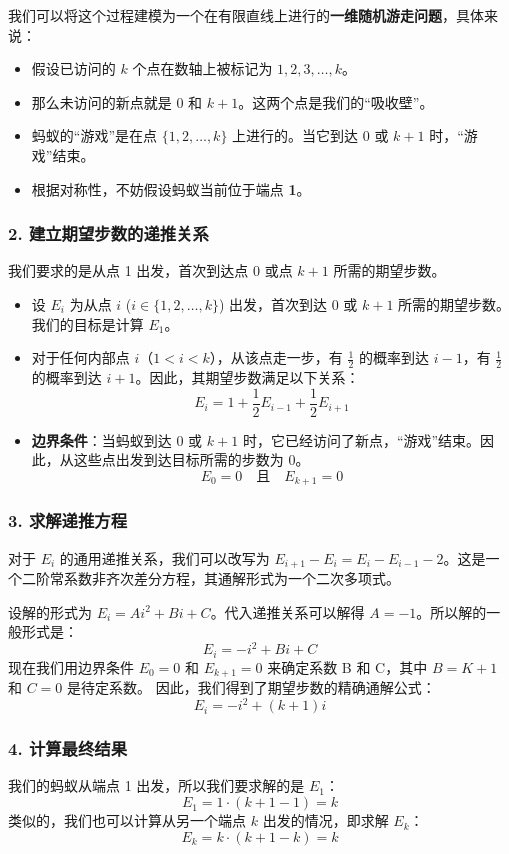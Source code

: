 \documentclass[UTF8]{ctexart}
\begin{document}
我们可以将这个过程建模为一个在有限直线上进行的\textbf{一维随机游走问题}，具体来说：
\begin{itemize}
    \item 假设已访问的 $k$ 个点在数轴上被标记为 $1, 2, 3, \dots, k$。
    \item 那么未访问的新点就是 0 和 $k+1$。这两个点是我们的“吸收壁”。
    \item 蚂蚁的“游戏”是在点 $\{1, 2, \dots, k\}$ 上进行的。当它到达 0 或 $k+1$ 时，“游戏”结束。
    \item 根据对称性，不妨假设蚂蚁当前位于端点 \textbf{1}。
\end{itemize}

\subsubsection*{2. 建立期望步数的递推关系}
我们要求的是从点 1 出发，首次到达点 0 或点 $k+1$ 所需的期望步数。
\begin{itemize}
    \item 设 $E_i$ 为从点 $i$ ($i \in \{1, 2, \dots, k\}$) 出发，首次到达 0 或 $k+1$ 所需的期望步数。我们的目标是计算 $E_1$。
    \item 对于任何内部点 $i$（$1 < i < k$），从该点走一步，有 $\frac{1}{2}$ 的概率到达 $i-1$，有 $\frac{1}{2}$ 的概率到达 $i+1$。因此，其期望步数满足以下关系：
    \[
    E_i = 1 + \frac{1}{2}E_{i-1} + \frac{1}{2}E_{i+1}
    \]
    \item \textbf{边界条件}：当蚂蚁到达 0 或 $k+1$ 时，它已经访问了新点，“游戏”结束。因此，从这些点出发到达目标所需的步数为 0。
    \[
    E_0 = 0 \quad \text{且} \quad E_{k+1} = 0
    \]
\end{itemize}

\subsubsection*{3. 求解递推方程}
对于 $E_i$ 的通用递推关系，我们可以改写为 $E_{i+1} - E_i = E_i - E_{i-1} - 2$。这是一个二阶常系数非齐次差分方程，其通解形式为一个二次多项式。

设解的形式为 $E_i = A i^2 + B i + C$。代入递推关系可以解得 $A=-1$。所以解的一般形式是：
\[ E_i = -i^2 + Bi + C \]
现在我们用边界条件 $E_0 = 0$ 和 $E_{k+1} = 0$ 来确定系数 B 和 C，其中 $B=K+1$ 和 $C=0$ 是待定系数。
因此，我们得到了期望步数的精确通解公式：
\[ E_i = -i^2 + (k+1)i  \]

\subsubsection*{4. 计算最终结果}
我们的蚂蚁从端点 1 出发，所以我们要求解的是 $E_1$：
\[ E_1 = 1 \cdot (k+1-1) = k \]
类似的，我们也可以计算从另一个端点 $k$ 出发的情况，即求解 $E_k$：
\[ E_k = k \cdot (k+1-k) = k \]
\end{document}

